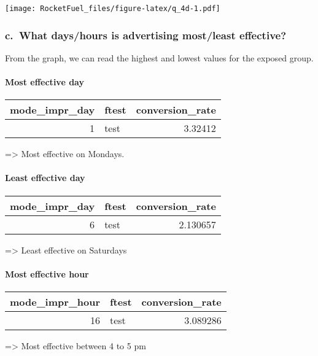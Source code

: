 \documentclass[
]{article}
\begin{document}
\texttt{[image: RocketFuel\_files/figure-latex/q\_4d-1.pdf]}

\hypertarget{c.-what-dayshours-is-advertising-mostleast-effective}{%
\subsubsection{c.~What days/hours is advertising most/least
effective?}\label{c.-what-dayshours-is-advertising-mostleast-effective}}

From the graph, we can read the highest and lowest values for the
exposed group.

\hypertarget{most-effective-day}{%
\paragraph{Most effective day}\label{most-effective-day}}

\begin{longtable}[]{@{}rlr@{}}
\toprule
mode\_impr\_day & ftest & conversion\_rate\tabularnewline
\midrule
\endhead
1 & test & 3.32412\tabularnewline
\bottomrule
\end{longtable}

=\textgreater{} Most effective on Mondays.

\hypertarget{least-effective-day}{%
\paragraph{Least effective day}\label{least-effective-day}}

\begin{longtable}[]{@{}rlr@{}}
\toprule
mode\_impr\_day & ftest & conversion\_rate\tabularnewline
\midrule
\endhead
6 & test & 2.130657\tabularnewline
\bottomrule
\end{longtable}

=\textgreater{} Least effective on Saturdays

\hypertarget{most-effective-hour}{%
\paragraph{Most effective hour}\label{most-effective-hour}}

\begin{longtable}[]{@{}rlr@{}}
\toprule
mode\_impr\_hour & ftest & conversion\_rate\tabularnewline
\midrule
\endhead
16 & test & 3.089286\tabularnewline
\bottomrule
\end{longtable}

=\textgreater{} Most effective between 4 to 5 pm
\end{document}
